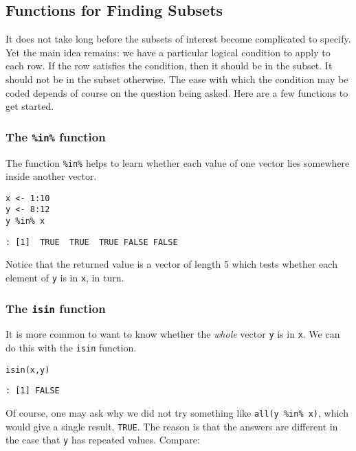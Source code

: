\subsection{Functions for Finding Subsets}
\label{sec-4-2-2}

It does not take long before the subsets of interest become
complicated to specify. Yet the main idea remains: we have a
particular logical condition to apply to each row. If the row
satisfies the condition, then it should be in the subset. It should
not be in the subset otherwise. The ease with which the condition may
be coded depends of course on the question being asked. Here are a few
functions to get started.

\subsubsection{The \texttt{\%in\%} function}
\label{sec-4-2-2-1}

The function \texttt{\%in\%} helps to learn whether each value of one vector
lies somewhere inside another vector.

\begin{verbatim}
x <- 1:10 
y <- 8:12 
y %in% x
\end{verbatim}

\begin{verbatim}
: [1]  TRUE  TRUE  TRUE FALSE FALSE
\end{verbatim}

Notice that the returned value is a vector of length 5 which tests
whether each element of \texttt{y} is in \texttt{x}, in turn.

\subsubsection{The \texttt{isin} function}
\label{sec-4-2-2-2}

It is more common to want to know whether the \emph{whole} vector \texttt{y} is in
\texttt{x}. We can do this with the \texttt{isin} function.

\begin{verbatim}
isin(x,y) 
\end{verbatim}

\begin{verbatim}
: [1] FALSE
\end{verbatim}

Of course, one may ask why we did not try something like \texttt{all(y \%in\%
x)}, which would give a single result, \texttt{TRUE}. The reason is that the
answers are different in the case that \texttt{y} has repeated
values. Compare:

